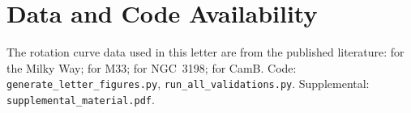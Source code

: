 \documentclass[fleqn,usenatbib]{mnras}
\begin{document}
\section{Data and Code Availability}
\label{sec:data}
The rotation curve data used in this letter are from the published literature: \citep{McMillan17} for the Milky Way; \citep{Corbelli00} for M33; \citep{Begeman91} for NGC~3198; \citep{Lelli16} for CamB. Code: \texttt{generate\_letter\_figures.py}, \texttt{run\_all\_validations.py}. Supplemental: \texttt{supplemental\_material.pdf}.



\end{document}
